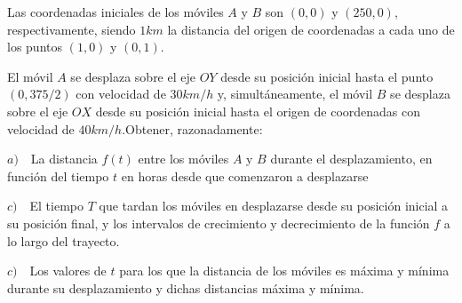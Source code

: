 	\begin{ejre}Las coordenadas iniciales de los móviles $A$ y $B$ son $(0,0)$ y $(250,0)$, respectivamente, siendo $1 km$ la distancia del origen de coordenadas a cada uno de los puntos $(1,0)$ y $(0,1)$. 
	
	El móvil $A$ se desplaza sobre el eje $OY$ desde su posición inicial hasta el punto $(0,375/2)$ con velocidad de $30 km/h$ y, simultáneamente, el móvil $B$ se desplaza sobre el eje $OX$ desde su posición inicial hasta el origen de coordenadas con velocidad de $40 km/h$.Obtener, razonadamente: 
	
	$a)\quad$La distancia  $f(t)$  entre los móviles $A$ y $B$ durante el desplazamiento, en función del tiempo $t$ en horas desde que comenzaron a desplazarse
	
	$c)\quad$El tiempo $T$ que tardan los móviles en desplazarse desde su posición inicial a su posición final, y los intervalos de crecimiento y decrecimiento de la función $f$ a lo largo del trayecto.
	
	$c)\quad$Los valores de $t$ para los que la distancia de los móviles es máxima y mínima durante su desplazamiento y dichas distancias máxima y mínima.	
	\end{ejre}
	
